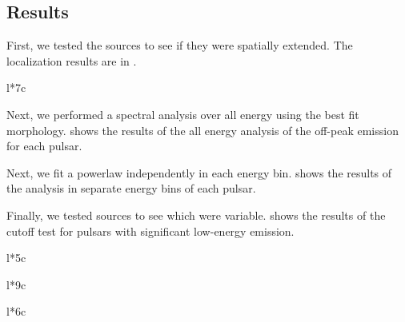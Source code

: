 \subsection{Results}

First, we tested the sources to see if they
were spatially extended. The localization results are in .

\begin{deluxetable}{l*{7}c}
\tabletypesize{\scriptsize}

\end{deluxetable}


Next, we performed a spectral analysis over all energy using the best
fit morphology.  shows the results of the all energy
analysis of the off-peak emission for each pulsar.

Next, we fit a powerlaw independently in each energy
bin.  shows the results of the analysis in separate
energy bins of each pulsar.

Finally, we tested sources to see which were
variable.  shows the results of the cutoff test for
pulsars with significant low-energy emission.


\begin{deluxetable}{l*{5}c}
\tabletypesize{\scriptsize}

\end{deluxetable}

\clearpage
\begin{deluxetable}{l*{9}c}
\setlength{\tabcolsep}{0.04in}
\tabletypesize{\scriptsize}
\tablewidth{0pt}
\rotate
{}

\end{deluxetable}

\begin{deluxetable}{l*{6}c}
\tabletypesize{\scriptsize}

\end{deluxetable}




